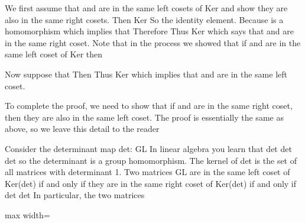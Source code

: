 \documentclass[11pt,oneside]{article}
\begin{document}
\begin{BookBody}

 We first assume that  and  are in the same left cosets of Ker\BookInline{(\phi )} and show they are also in the same right cosets. Then  Ker So  the identity element. Because \BookInline{\phi } is a homomorphism which implies that  Therefore Thus  Ker\BookInline{(\phi ),\allowbreak } which says that  and  are in the same right coset. Note that in the process we showed that if  and  are in the same left coset of Ker\BookInline{(\phi ),\allowbreak } then 

Now suppose that  Then  Thus  Ker\BookInline{(\phi ),\allowbreak } which implies that  and  are in the same left coset.

To complete the proof, we need to show that if  and  are in the same right coset, then they are also in the same left coset. The proof is essentially the same as above, so we leave this detail to the reader\BookEnd{\blacklozenge}

 Consider the determinant map det: GL In linear algebra you learn that det det det so the determinant is a group homomorphism. The kernel of det is the set of all  matrices with determinant 1. Two matrices  GL are in the same left coset of Ker(det) if and only if they are in the same right coset of Ker(det) if and only if det det In particular, the two matrices

\begin{center}\begin{adjustbox}{max width=\linewidth}\end{adjustbox}\end{center}


\end{BookBody}
\end{document}
